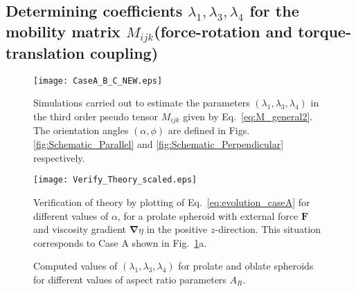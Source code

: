 \documentclass{jfm}
\begin{document}
 \subsection{Determining coefficients $\lambda_1,\lambda_3,\lambda_4$ for the mobility matrix $M_{ijk}$(force-rotation and torque-translation coupling)}
 \label{sec:Design_Simulations}

\begin{figure}
\centering
\texttt{[image: CaseA\_B\_C\_NEW.eps]}
\caption{Simulations carried out to estimate the parameters $(\lambda_1,\lambda_3,\lambda_4)$ in the third order pseudo tensor $M_{ijk}$ given by Eq.~\eqref{eq:M_general2}.  The orientation angles $(\alpha, \phi)$ are defined in Figs. \ref{fig:Schematic_Parallel} and \ref{fig:Schematic_Perpendicular} respectively.  }
\label{fig:Case_A_B_C}
\end{figure}

\begin{figure}
\centering
\texttt{[image: Verify\_Theory\_scaled.eps]}
\caption{Verification of theory by plotting  of Eq.~\eqref{eq:evolution_caseA} for different values of $\alpha$, for a prolate spheroid with external force $\boldsymbol{F}$ and viscosity gradient $\boldsymbol{\nabla} \eta$ in the positive $z$-direction. This situation corresponds to Case A shown in Fig.~\ref{fig:Case_A_B_C}a.}
\label{fig:Theory_Verification}
\end{figure}






\begin{figure}
\centering
{}

\caption{Computed values of $(\lambda_1, \lambda_3, \lambda_4)$ for prolate and oblate spheroids for different values of aspect ratio parameters $A_R$.}
\label{fig:Lambda_Estimation}
\end{figure}



 
\end{document}
